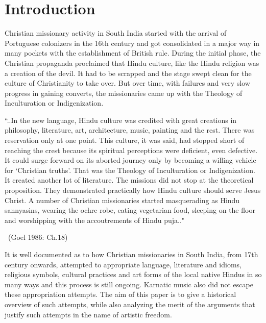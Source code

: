 \vspace{-.3cm}

\section*{Introduction}

Christian missionary activity in South India started with the arrival of Portuguese colonizers in the 16th century and got consolidated in a major way in many pockets with the establishment of British rule. During the initial phase, the Christian propaganda proclaimed that Hindu culture, like the Hindu religion was a creation of the devil. It had to be scrapped and the stage swept clean for the culture of Christianity to take over. But over time, with failures and very slow progress in gaining converts, the missionaries came up with the Theology of Inculturation or Indigenization.

\begin{myquote}
``..In the new language, Hindu culture was credited with great creations in philosophy, literature, art, architecture, music, painting and the rest. There was reservation only at one point. This culture, it was said, had stopped short of reaching the crest because its spiritual perceptions were deficient, even defective. It could surge forward on its aborted journey only by becoming a willing vehicle for `Christian truths'. That was the Theology of Inculturation or Indigenization. It created another lot of literature. The missions did not stop at the theoretical proposition. They demonstrated practically how Hindu culture should serve Jesus Christ. A number of Christian missionaries started masquerading as Hindu sannyasins, wearing the ochre robe, eating vegetarian food, sleeping on the floor and worshipping with the accoutrements of Hindu puja.." 

~\hfill (Goel 1986: Ch.18)
\end{myquote}

It is well documented as to how Christian missionaries in South India, from 17th century onwards, attempted to appropriate language, literature and idioms, religious symbols, cultural practices and art forms of the local native Hindus in so many ways and this process is still ongoing. Karnatic music also did not escape these appropriation attempts. The aim of this paper is to give a historical overview of such attempts, while also analyzing the merit of the arguments that justify such attempts in the name of artistic freedom.

